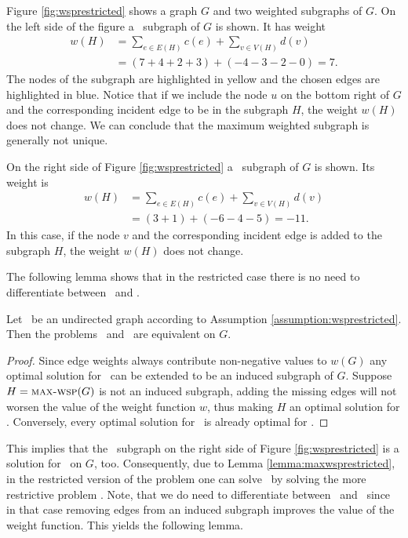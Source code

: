 \begin{example}
	\label{ex:wsprestricted}
	Figure \ref{fig:wsprestricted} shows a graph $G$ and two weighted subgraphs of $G$. On the left side of the figure a \maxWSP\ subgraph of $G$ is shown. It has weight
	\begin{align*}
	w(H) &= \sum_{e\in E(H)} c(e) + \sum_{v\in V(H)} d(v)\\
	&= (7 + 4 + 2 + 3) + (-4 - 3 - 2 - 0) = 7.
	\end{align*}
	The nodes of the subgraph are highlighted in yellow and the chosen edges are highlighted in blue. Notice that if we include the node $u$ on the bottom right of $G$ and the corresponding incident edge to be in the subgraph $H$, the weight $w(H)$ does not change. We can conclude that the maximum weighted subgraph is generally not unique.\medskip
	
	On the right side of Figure \ref{fig:wsprestricted} a \minWSP\ subgraph of $G$ is shown. Its weight is
	\begin{align*}
	w(H) &= \sum_{e\in E(H)} c(e) + \sum_{v\in V(H)} d(v)\\
	&= (3 + 1) + (-6 - 4 - 5) = -11.
	\end{align*}
	In this case, if the node $v$ and the corresponding incident edge is added to the subgraph $H$, the weight $w(H)$ does not change.
\end{example}

The following lemma shows that in the restricted case there is no need to differentiate between \maxWSP\ and \maxWISP.

\begin{lemma}
	\label{lemma:maxwsprestricted}
	Let \ugraph\ be an undirected graph according to Assumption \ref{assumption:wsprestricted}. Then the problems \maxWSP\ and \maxWISP\ are equivalent on $G$.
\end{lemma}
\begin{proof}
	Since edge weights always contribute non-negative values to $w(G)$ any optimal solution for \maxWSP\ can be extended to be an induced subgraph of $G$. Suppose $H = \text{\textsc{max-wsp}}(G)$ is not an induced subgraph, adding the missing edges will not worsen the value of the weight function $w$, thus making $H$ an optimal solution for \maxWISP. Conversely, every optimal solution for \maxWISP\ is already optimal for \maxWSP.
\end{proof}

This implies that the \maxWSP\ subgraph on the right side of Figure \ref{fig:wsprestricted} is a solution for \maxWISP\ on $G$, too. Consequently, due to Lemma \ref{lemma:maxwsprestricted}, in the restricted version of the problem one can solve \maxWSP\ by solving the more restrictive problem \maxWISP. Note, that we do need to differentiate between \minWSP\ and \minWISP\ since in that case removing edges from an induced subgraph improves the value of the weight function. This yields the following lemma.

